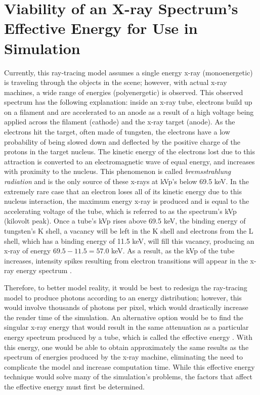 %

\chapter{Viability of an X-ray Spectrum's Effective Energy for Use in Simulation}
\label{cha:xray_tracer_validation}

\par Currently, this ray-tracing model assumes a single energy x-ray (monoenergetic) is traveling through the objects in the scene; however, with actual x-ray machines, a wide range of energies (polyenergetic) is observed. This observed spectrum has the following explanation: inside an x-ray tube, electrons build up on a filament and are accelerated to an anode as a result of a high voltage being applied across the filament (cathode) and the x-ray target (anode). As the electrons hit the target, often made of tungsten, the electrons have a low probability of being slowed down and deflected by the positive charge of the protons in the target nucleus. The kinetic energy of the electrons lost due to this attraction is converted to an electromagnetic wave of equal energy, and increases with proximity to the nucleus. This phenomenon is called \textit{bremsstrahlung radiation} and is the only source of these x-rays at kVp's below 69.5 keV. In the extremely rare case that an electron loses all of its kinetic energy due to this nucleus interaction, the maximum energy x-ray is produced and is equal to the accelerating voltage of the tube, which is referred to as the spectrum's kVp (kilovolt peak). Once a tube's kVp rises above 69.5 keV, the binding energy of tungsten's K shell, a vacancy will be left in the K shell and electrons from the L shell, which has a binding energy of 11.5 keV, will fill this vacancy, producing an x-ray of energy $69.5 - 11.5 = 57.0$ keV. As a result, as the kVp of the tube increases, intensity spikes resulting from electron transitions will appear in the x-ray energy spectrum \cite{Seibert}.

\par Therefore, to better model reality, it would be best to redesign the ray-tracing model to produce photons according to an energy distribution; however, this would involve thousands of photons per pixel, which would drastically increase the render time of the simulation. An alternative option would be to find the singular x-ray energy that would result in the same attenuation as a particular energy spectrum produced by a tube, which is called the effective energy \cite{Seibert}. With this energy, one would be able to obtain approximately the same results as the spectrum of energies produced by the x-ray machine, eliminating the need to complicate the model and increase computation time. While this effective energy technique would solve many of the simulation's problems, the factors that affect the effective energy must first be determined.

